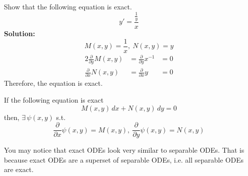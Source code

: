 \documentclass[diffeq.tex]{subfiles}
\begin{document}
    \np
    \begin{example}
        Show that the following equation is exact.
        \begin{equation}
            y' = \frac{\frac{1}{y}}{x}
        \end{equation}
        \textbf{Solution:}
        \begin{equation}
            M(x, y) = \frac{1}{x},\ N(x, y) = y
        \end{equation}
        \begin{alignat}{2}
            \frac{\partial}{\partial y}M(x, y) &= \frac{\partial}{\partial y}x^{-1} &= 0\\
            \frac{\partial}{\partial x}N(x, y) &= \frac{\partial}{\partial x}y &= 0
        \end{alignat}
        Therefore, the equation is exact.
    \end{example}
    \begin{theorem}[Exactness]
        If the following equation is exact
        \begin{equation}
            M(x, y)\,dx + N(x, y)\,dy = 0
        \end{equation}
        then, $\exists\,\psi(x, y)$ s.t.
        \begin{equation}
            \frac{\partial}{\partial x}\psi(x, y) = M(x, y),\ \frac{\partial}{\partial y}\psi(x, y) = N(x, y)
        \end{equation}
    \end{theorem}
    \begin{remark}
        You may notice that exact ODEs look very similar to separable ODEs. That is because exact ODEs are a superset of separable ODEs, i.e. all separable ODEs are exact.
    \end{remark}
\end{document}
